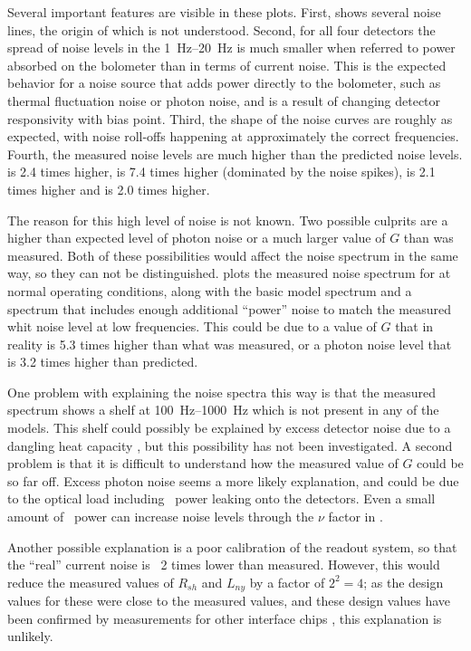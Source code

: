 Several important features are visible in these plots.
First,  shows several noise lines, the origin of which is not understood.
Second, for all four detectors the spread of noise levels in the \SIrange{1}{20}{\hertz} is much smaller when referred to power absorbed on the bolometer than in terms of current noise.
This is the expected behavior for a noise source that adds power directly to the bolometer, such as thermal fluctuation noise or photon noise, and is a result of changing detector responsivity with bias point.
Third, the shape of the noise curves are roughly as expected, with noise roll-offs happening at approximately the correct frequencies.
Fourth, the measured noise levels are much higher than the predicted noise levels.
 is 2.4 times higher,  is 7.4 times higher (dominated by the noise spikes),  is 2.1 times higher and  is 2.0 times higher.

The reason for this high level of noise is not known.
Two possible culprits are a higher than expected level of photon noise or a much larger value of $G$ than was measured.
Both of these possibilities would affect the noise spectrum in the same way, so they can not be distinguished.
 plots the measured noise spectrum for  at normal operating conditions, along with the basic model spectrum and a spectrum that includes enough additional ``power'' noise to match the measured whit noise level at low frequencies.
This could be due to a value of $G$ that in reality is 5.3 times higher than what was measured, or a photon noise level that is 3.2 times higher than predicted.

One problem with explaining the noise spectra this way is that the measured spectrum shows a shelf at \SIrange{100}{1000}{\hertz} which is not present in any of the models.
This shelf could possibly be explained by excess detector noise due to a dangling heat capacity \cite{xxx}, but this possibility has not been investigated.
A second problem is that it is difficult to understand how the measured value of $G$ could be so far off.
Excess photon noise seems a more likely explanation, and could be due to the optical load including \IR\ power leaking onto the detectors.
Even a small amount of \IR\ power can increase noise levels through the $\nu$ factor in .

Another possible explanation is a poor calibration of the readout system, so that the ``real'' current noise is \abt\ 2 times lower than measured.
However, this would reduce the measured values of $R_{sh}$ and $L_{ny}$ by a factor of $2^2=4$; as the design values for these were close to the measured values, and these design values have been confirmed by measurements for other interface chips \cite{appel pers comm}, this explanation is unlikely. 

